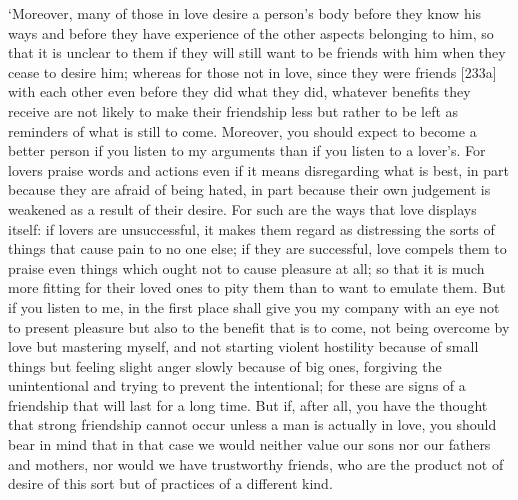 ‘Moreover, many of those in love desire a person's body before they know
his ways and before they have experience of  the other aspects
belonging to him, so that it is unclear to them if they will still want
to be friends with him when they cease to desire him; whereas for those
not in love, since they were friends {[}233a{]} with each other even
before they did what they did, whatever benefits they
receive are not likely to
make their friendship less but rather to be left as reminders of what is
still to come. Moreover, you should expect to become a better person if
you  listen to my arguments than if you listen to a lover's. For
lovers praise words and actions even if it means disregarding what is
best, in part because they are afraid of being hated, in part because
their own judgement is weakened as a result of their  desire.
For such are the ways that love displays itself: if lovers are
unsuccessful, it makes them regard as distressing the sorts of things
that cause pain to no one else; if they are successful, love compels
them to praise even things which ought not to  cause pleasure at
all; so that it is much more fitting for their loved ones to pity them
than to want to emulate them. But if you listen to me, in the first
place shall give you my company  with an eye not to present
pleasure but also to the benefit that is to come, not being overcome by
love but mastering myself, and not starting violent hostility because of
small things but feeling slight anger slowly because of big ones,
forgiving the  unintentional and trying to prevent the
intentional; for these are signs of a friendship that will last for a
long time. But if, after all, you have the thought that strong
friendship cannot  occur unless a man is actually in love, you
should bear in mind that in that case we would neither value our sons
nor our fathers and mothers, nor would we have trustworthy friends, who
are the product not of desire of this sort but of practices of a
different kind.

